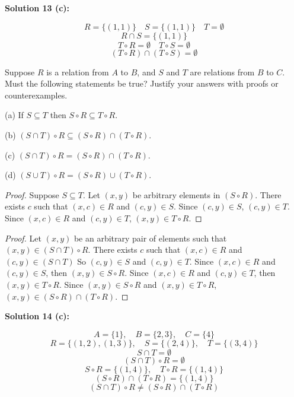 \textbf{Solution 13 (c):}

\[R = \{(1, 1)\} \quad S = \{(1, 1)\} \quad T = \emptyset\]
\[R \cap S = \{(1, 1)\}\]
\[T \circ R = \emptyset \quad T \circ S = \emptyset\]
\[(T \circ R) \cap (T \circ S) = \emptyset\]

\begin{tcolorbox}[title=Problem 14, breakable]
    Suppose $R$ is a relation from $A$ to $B$, and $S$ and $T$ are relations from $B$ to $C$.
    Must the following statements be true? Justify your answers with proofs or counterexamples.

    (a) If $S \subseteq T$ then $S \circ R \subseteq T \circ R$.

    (b) $(S \cap T) \circ R \subseteq (S \circ R) \cap (T \circ R)$.

    (c) $(S \cap T) \circ R  = (S \circ R) \cap (T \circ R)$.

    (d) $(S \cup T) \circ R = (S \circ R) \cup (T \circ R)$.
\end{tcolorbox}

\begin{proof}
    Suppose $S \subseteq T$.
    Let $(x, y)$ be arbitrary elements in $(S \circ R)$.
    There exists $c$ such that $(x, c) \in R$ and $(c, y) \in S$.
    Since $(c, y) \in S$, $(c, y) \in T$.
    Since $(x, c) \in R$ and $(c, y) \in T$, $(x, y) \in T \circ R$.
\end{proof}

\begin{proof}
    Let $(x, y)$ be an arbitrary pair of elements such that $(x, y) \in (S \cap T) \circ R$.
    There exists $c$ such that $(x, c) \in R$ and $(c, y) \in (S \cap T)$
    So $(c, y) \in S$ and $(c, y) \in T$.
    Since $(x, c) \in R$ and $(c, y) \in S$, then $(x, y) \in S \circ R$.
    Since $(x, c) \in R$ and $(c, y) \in T$, then $(x, y) \in T \circ R$.
    Since $(x, y) \in S \circ R$ and $(x, y) \in T \circ R$, $(x, y) \in (S \circ R) \cap (T \circ R)$.
\end{proof}

\textbf{Solution 14 (c):}

\[A = \{1\}, \quad B = \{2,3\}, \quad C = \{4\}\]
\[R = \{(1,2), (1,3)\}, \quad S = \{(2,4)\}, \quad T = \{(3,4)\}\]
\[S \cap T = \emptyset\]\[(S \cap T) \circ R = \emptyset\]
\[S \circ R = \{(1,4)\}, \quad T \circ R = \{(1,4)\}\]
\[(S \circ R) \cap (T \circ R) = \{(1,4)\}\]
\[(S \cap T) \circ R \neq (S \circ R) \cap (T \circ R)\]


